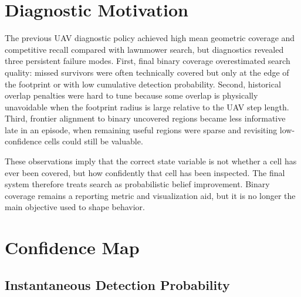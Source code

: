 \documentclass{article}
\begin{document}
\section{Diagnostic Motivation}

The previous UAV diagnostic policy achieved high mean geometric coverage and
competitive recall compared with lawnmower search, but diagnostics revealed
three persistent failure modes. First, final binary coverage overestimated
search quality: missed survivors were often technically covered but only at the
edge of the footprint or with low cumulative detection probability. Second,
historical overlap penalties were hard to tune because some overlap is physically
unavoidable when the footprint radius is large relative to the UAV step length.
Third, frontier alignment to binary uncovered regions became less informative
late in an episode, when remaining useful regions were sparse and revisiting
low-confidence cells could still be valuable.

These observations imply that the correct state variable is not whether a cell
has ever been covered, but how confidently that cell has been inspected. The
final system therefore treats search as probabilistic belief improvement. Binary
coverage remains a reporting metric and visualization aid, but it is no longer
the main objective used to shape behavior.

\section{Confidence Map}

\subsection{Instantaneous Detection Probability}
\end{document}
